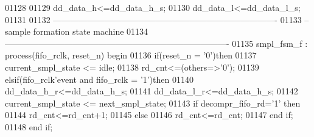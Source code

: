 \begin{DoxyCode}
01128         
01129 \textcolor{vhdlchar}{dd_data_h}\textcolor{vhdlchar}{<=}\textcolor{vhdlchar}{dd_data_h_s};
01130 \textcolor{vhdlchar}{dd_data_l}\textcolor{vhdlchar}{<=}\textcolor{vhdlchar}{dd_data_l_s};        
01131         
01132 \textcolor{keyword}{-------------------------------------------------------------------------------}
01133 \textcolor{keyword}{--sample formation state machine}
01134 \textcolor{keyword}{-------------------------------------------------------------------------------}
01135 smpl\_fsm\_f : \textcolor{keywordflow}{process}(fifo_rclk, reset_n) \textcolor{keywordflow}{begin}
01136     \textcolor{keywordflow}{if}\textcolor{vhdlchar}{(}\textcolor{vhdlchar}{reset_n} \textcolor{vhdlchar}{=} \textcolor{vhdlchar}{'}\textcolor{vhdllogic}{}\textcolor{vhdllogic}{0}\textcolor{vhdlchar}{'}\textcolor{vhdlchar}{)}\textcolor{keywordflow}{then}
01137         \textcolor{vhdlchar}{current_smpl_state} \textcolor{vhdlchar}{<=} \textcolor{vhdlchar}{idle};
01138         \textcolor{vhdlchar}{rd_cnt}\textcolor{vhdlchar}{<=}\textcolor{vhdlchar}{(}\textcolor{keywordflow}{others}\textcolor{vhdlchar}{=}\textcolor{vhdlchar}{>}\textcolor{vhdlchar}{'}\textcolor{vhdllogic}{}\textcolor{vhdllogic}{0}\textcolor{vhdlchar}{'}\textcolor{vhdlchar}{)};
01139     \textcolor{keywordflow}{elsif}\textcolor{vhdlchar}{(}\textcolor{vhdlchar}{fifo_rclk}\textcolor{vhdlchar}{'}\textcolor{vhdlkeyword}{event} \textcolor{keywordflow}{and} \textcolor{vhdlchar}{fifo_rclk} \textcolor{vhdlchar}{=} \textcolor{vhdlchar}{'}\textcolor{vhdllogic}{}\textcolor{vhdllogic}{1}\textcolor{vhdlchar}{'}\textcolor{vhdlchar}{)}\textcolor{keywordflow}{then}
01140         \textcolor{vhdlchar}{dd_data_h_r}\textcolor{vhdlchar}{<=}\textcolor{vhdlchar}{dd_data_h_s};
01141         \textcolor{vhdlchar}{dd_data_l_r}\textcolor{vhdlchar}{<=}\textcolor{vhdlchar}{dd_data_h_s};
01142         \textcolor{vhdlchar}{current_smpl_state} \textcolor{vhdlchar}{<=} \textcolor{vhdlchar}{next_smpl_state};
01143         \textcolor{keywordflow}{if} \textcolor{vhdlchar}{decompr_fifo_rd}\textcolor{vhdlchar}{=}\textcolor{vhdlchar}{'}\textcolor{vhdllogic}{}\textcolor{vhdllogic}{1}\textcolor{vhdlchar}{'} \textcolor{keywordflow}{then} 
01144             \textcolor{vhdlchar}{rd_cnt}\textcolor{vhdlchar}{<=}\textcolor{vhdlchar}{rd_cnt}\textcolor{vhdlchar}{+}\textcolor{vhdllogic}{}\textcolor{vhdllogic}{1};
01145             \textcolor{keywordflow}{else} 
01146             \textcolor{vhdlchar}{rd_cnt}\textcolor{vhdlchar}{<=}\textcolor{vhdlchar}{rd_cnt};
01147         \textcolor{keywordflow}{end} \textcolor{keywordflow}{if};
01148     \textcolor{keywordflow}{end} \textcolor{keywordflow}{if}; 

\end{DoxyCode}
